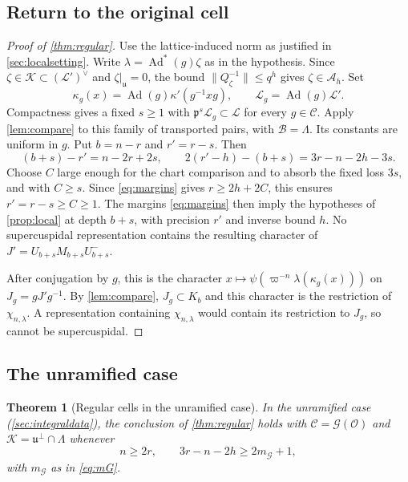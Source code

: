 \documentclass[11pt,reqno]{amsart}
\numberwithin{equation}{section}
\theoremstyle{plain}
\newtheorem{theorem}{Theorem}[section]
\theoremstyle{definition}
\theoremstyle{remark}
\theoremstyle{plain}
\newcommand{\OO}{\mathcal{O}}    %
\newcommand{\pp}{\mathfrak{p}}   %
\newcommand{\Lat}{\mathcal{L}}   %
\newcommand{\dLat}{\Lambda}      %
\newcommand{\g}{\mathfrak{g}}    %
\newcommand{\gd}{\mathfrak{g}^*} %
\newcommand{\uu}{\mathfrak{u}}   %
\newcommand{\cG}{\mathcal{G}}                   %
\newcommand{\norm}[1]{\lVert#1\rVert}
\DeclareMathOperator{\Ad}{Ad}
\newcommand{\lf}{\lambda}
\newcommand{\nf}{\zeta}
\begin{document}
\subsection{Return to the original cell}\label{sec:returncell}
\begin{proof}[Proof of \cref{thm:regular}]
Use the lattice-induced norm as justified in \cref{sec:localsetting}.
Write $\lf=\Ad^*(g)\nf$ as in the hypothesis. Since
$\nf\in\mathcal K\subset(\Lat')^\vee$ and $\nf|_\uu=0$, the bound
$\norm{Q_\nf^{-1}}\le q^h$ gives $\nf\in\mathcal A_h$.
Set
\[
\kappa_g(x)=\Ad(g)\kappa'(g^{-1}xg),\qquad
\Lat_g=\Ad(g)\Lat'.
\]
Compactness gives a fixed $s\ge1$ with
$\pp^s\Lat_g\subset\Lat$ for every $g\in\mathcal C$.
Apply \cref{lem:compare} to this family of transported pairs, with
$\mathcal B=\dLat$. Its constants are uniform in $g$.
Put $b=n-r$ and $r'=r-s$. Then
\[
(b+s)-r'=n-2r+2s,\qquad
2(r'-h)-(b+s)=3r-n-2h-3s.
\]
Choose $C$ large enough for the chart comparison and to absorb the
fixed loss $3s$, and with $C\ge s$. Since \eqref{eq:margins} gives
$r\ge2h+2C$, this ensures $r'=r-s\ge C\ge1$. The margins \eqref{eq:margins} then imply the
hypotheses of \cref{prop:local} at depth $b+s$, with precision $r'$
and inverse bound $h$. No supercuspidal representation contains
the resulting character of $J'=U_{b+s}M_{b+s}U^-_{b+s}$.

After conjugation by $g$, this is the character
$x\mapsto\psi(\varpi^{-n}\lf(\kappa_g(x)))$ on
$J_g=gJ'g^{-1}$. By \cref{lem:compare}, $J_g\subset K_b$ and this
character is the restriction of $\chi_{n,\lf}$. A representation
containing $\chi_{n,\lf}$ would contain its restriction to $J_g$,
so cannot be supercuspidal.
\end{proof}

\subsection{The unramified case}\label{sec:regularunram}

\begin{theorem}[Regular cells in the unramified case]\label{thm:regularunram}
In the unramified case (\cref{sec:integraldata}), the conclusion of
\cref{thm:regular} holds with $\mathcal C=\cG(\OO)$ and
$\mathcal K=\uu^\perp\cap\dLat$ whenever
\begin{equation}\label{eq:explicitmargins}
n\ge2r,\qquad 3r-n-2h\ge2m_{\cG}+1,
\end{equation}
with $m_{\cG}$ as in \eqref{eq:mG}.
\end{theorem}
\end{document}
